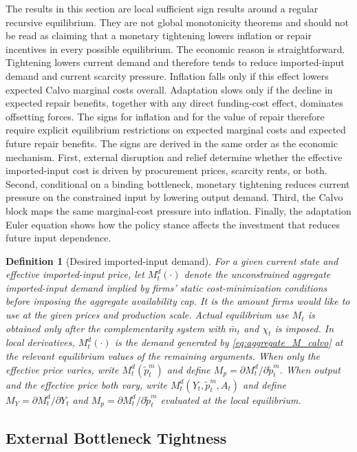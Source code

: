 ﻿\documentclass[12pt]{article}
\newtheorem{definition}{Definition}
\theoremstyle{remark}
\begin{document}
The results in this section are local sufficient sign results around a regular recursive
equilibrium. They are not global monotonicity theorems and should not be read as claiming that a
monetary tightening lowers inflation or repair incentives in every possible equilibrium. The
economic reason is straightforward. Tightening lowers current demand and therefore tends to reduce
imported-input demand and current scarcity pressure. Inflation falls only if this effect lowers
expected Calvo marginal costs overall. Adaptation slows only if the decline in expected repair
benefits, together with any direct funding-cost effect, dominates offsetting forces. The signs for
inflation and for the value of repair therefore require explicit equilibrium restrictions on
expected marginal costs and expected future repair benefits. The signs are derived in the same
order as the economic mechanism. First, external
disruption and relief determine whether the effective imported-input cost is driven by procurement
prices, scarcity rents, or both. Second, conditional on a binding bottleneck, monetary tightening
reduces current pressure on the constrained input by lowering output demand. Third, the Calvo block
maps the same marginal-cost pressure into inflation. Finally, the adaptation Euler equation shows
how the policy stance affects the investment that reduces future input dependence.

\begin{definition}[Desired imported-input demand]\label{def:desired_import_demand}
For a given current state and effective imported-input price, let $M_t^d(\cdot)$ denote the
unconstrained aggregate imported-input demand implied by firms' static cost-minimization conditions
before imposing the aggregate availability cap. It is the amount firms would like to use at the
given prices and production scale. Actual equilibrium use $M_t$ is obtained only after the
complementarity system with $\bar m_t$ and $\chi_t$ is imposed. In local derivatives, $M_t^d(\cdot)$
is the demand generated by \eqref{eq:aggregate_M_calvo} at the relevant equilibrium values of the
remaining arguments. When only the effective price varies, write $M_t^d(\tilde p_t^m)$ and define
$M_p=\partial M_t^d/\partial\tilde p_t^m$. When output and the effective price both vary, write
$M_t^d(Y_t,\tilde p_t^m,A_t)$ and define $M_Y=\partial M_t^d/\partial Y_t$ and
$M_p=\partial M_t^d/\partial\tilde p_t^m$ evaluated at the local equilibrium.
\end{definition}

\subsection{External Bottleneck Tightness}
\end{document}
